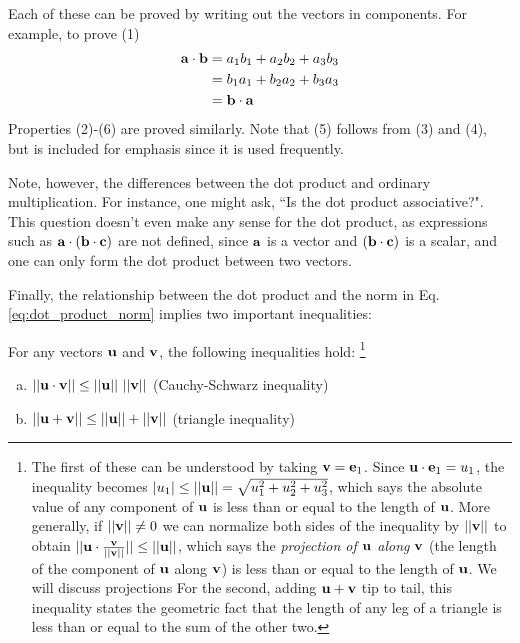 \documentclass[12pt,letterpaper,reqno]{article}
\numberwithin{equation}{section}
\newcommand{\ti}[1]{\textit{#1}}
\newcommand{\fixme}[1]{{\color{orange}{[#1]}}}
\begin{document}
\begin{pf}
Each of these can be proved by writing out the vectors in components. For example, to prove (1)
\begin{align*}
	{\bf a}\cdot {\bf b}&=a_1b_1+a_2b_2+a_3b_3 \\
	&=b_1a_1+b_2a_2+b_3a_3 \\
	&={\bf b}\cdot {\bf a}
\end{align*}
Properties (2)-(6) are proved similarly. Note that (5) follows from (3) and (4), but is included for emphasis since it is used frequently. 	
\end{pf}

\fixme{Add exercises using these properties.}

Note, however, the differences between the dot product and ordinary multiplication. For instance, one might ask, ``Is the dot product associative?". This question doesn't even make any sense for the dot product, as expressions such as ${\bf a}\cdot ({\bf b}\cdot {\bf c})$ are not defined, since ${\bf a}$ is a vector and $({\bf b}\cdot {\bf c})$ is a scalar, and one can only form the dot product between two vectors. 


Finally, the relationship between the dot product and the norm in Eq. \eqref{eq:dot_product_norm} implies two important inequalities:

\begin{prop}
For any vectors ${\bf u}$ and ${\bf v}$, the following inequalities hold: \footnote{The first of these can be understood by taking ${\bf v}={\bf e}_1$. Since ${\bf u}\cdot {\bf e}_1=u_1$, the inequality becomes $|u_1| \leq ||{\bf u}||=\sqrt{u_1^2+u_2^2+u_3^2}$, which says the absolute value of any component of ${\bf u}$ is less than or equal to the length of ${\bf u}$. More generally, if $||{\bf v}|| \neq 0$ we can normalize both sides of the inequality by $||{\bf v}||$ to obtain $||{\bf u}\cdot \frac{{\bf v}}{||{\bf v}||}|| \leq ||{\bf u}||$, which says the \ti{projection of ${\bf u}$ along ${\bf v}$} (the length of the component of ${\bf u}$ along ${\bf v}$) is less than or equal to the length of ${\bf u}$. We will discuss projections   For the second, adding ${\bf u}+{\bf v}$ tip to tail, this inequality states the geometric fact that the length of any leg of a triangle is less than or equal to the sum of the other two.}
\begin{enumerate}[(a)]
	\item $||{\bf u}\cdot {\bf v}|| \leq ||{\bf u}|| \ ||{\bf v}||$ (Cauchy-Schwarz inequality)
		\item $||{\bf u}+{\bf v}||\leq ||{\bf u}|| + ||{\bf v}||$ (triangle inequality) 
\end{enumerate}
\end{prop}
\end{document}
